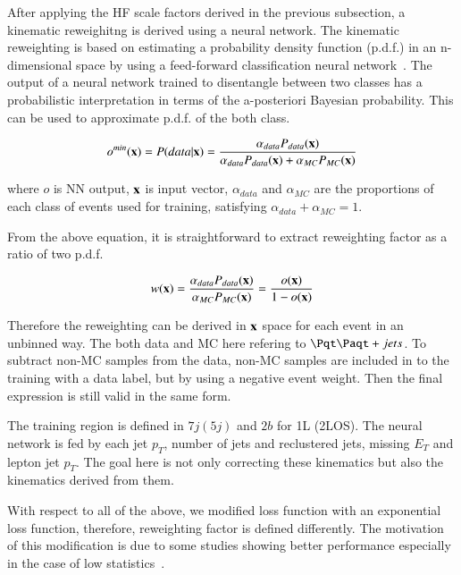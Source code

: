 After applying the HF scale factors derived in the previous subsection, a kinematic reweighitng is derived using a neural network. The kinematic reweighting is based on estimating a probability density function (p.d.f.) in an n-dimensional space by using a feed-forward classification neural network~\cite{nn_pdfs}. The output of a neural network trained to disentangle between two classes has a probabilistic interpretation in terms of the a-posteriori Bayesian probability. This can be used to approximate p.d.f. of the both class.

\begin{equation}
  o^{min}({\bf x}) = P(data|{\bf x}) = \dfrac{\alpha_{data}P_{data}({\bf x})}{\alpha_{data}P_{data}({\bf x})+\alpha_{MC}P_{MC}({\bf x})}
\end{equation}

where $o$ is NN output, ${\bf x}$ is input vector, $\alpha_{data}$ and $\alpha_{MC}$ are the proportions of each class of events used for training, satisfying $\alpha_{data} + \alpha_{MC} = 1$.

From the above equation, it is straightforward to extract reweighting factor as a ratio of two p.d.f.

\begin{equation}
  w({\bf x}) = \dfrac{\alpha_{data}P_{data}({\bf x})}{\alpha_{MC}P_{MC}({\bf x})} = \dfrac{o({\bf x})}{1-o({\bf x})}
  \label{rew::1l}
\end{equation}

Therefore the reweighting can be derived in ${\bf x}$ space for each event in an unbinned way. The both data and MC here refering to $\ttbar +jets$. To subtract non-\ttbar MC samples from the data, non-\ttbar MC samples are included in to the training with a data label, but by using a negative event weight. Then the final expression is still valid in the same form.

The training region is defined in $7j (5j)$ and $2b$ for 1L (2LOS). The neural network is fed by each jet $p_T$, number of jets and reclustered jets, missing $E_T$ and lepton jet $p_T$. The goal here is not only correcting these kinematics but also the kinematics derived from them.

With respect to all of the above, we modified loss function with an exponential loss function, therefore, reweighting factor is defined differently.
The motivation of this modification is due to some studies showing better performance especially in the case of low statistics~\cite{moustakides2019training}.


